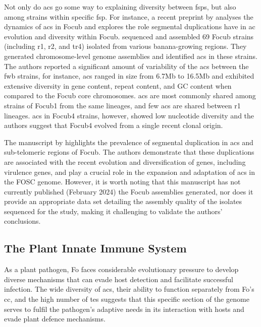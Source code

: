 Not only do \acp{ac} go some way to explaining diversity between \acp{fsp}, but also among strains within specific \ac{fsp}. For instance, a recent preprint by \textcite{Westerhoven2023} analyses the dynamics of \acp{ac} in \ac{Focub} and explores the role segmental duplications have in \ac{ac} evolution and diversity within \ac{Focub}. \textcite{Westerhoven2023} sequenced and assembled 69 \ac{Focub} strains (including \ac{r1}, \ac{r2}, and \ac{tr4})  isolated from various banana-growing regions. They generated chromosome-level genome assemblies and identified \acp{ac} in these strains.  The authors reported a significant amount of variability of the \acp{ac} between the \ac{fwb} strains, for instance, \acp{ac} ranged in size from 6.7Mb to 16.5Mb and exhibited extensive diversity in gene content, repeat content, and GC content when compared to the \ac{Focub} core chromosomes. \Acp{ac} are most commonly shared among strains of \ac{Focub1} from the same lineages, and few \acp{ac} are shared between \ac{r1} lineages. \Acp{ac} in \ac{Focub4} strains, however, showed low nucleotide diversity and the authors suggest that \ac{Focub4} evolved from a single recent clonal origin. 

The manuscript by \textcite{Westerhoven2023} highlights the prevalence of segmental duplication in \acp{ac} and sub-telomeric regions of \ac{Focub}. The authors demonstrate that these duplications are associated with the recent evolution and diversification of genes, including virulence genes, and play a crucial role in the expansion and adaptation of \acp{ac} in the \ac{FOSC} genome. However, it is worth noting that this manuscript has not currently published (February 2024) the \ac{Focub} assemblies generated, nor does it provide an appropriate data set detailing the assembly quality of the isolates sequenced for the study, making it challenging to validate the authors' conclusions. 

\subsection{The Plant Innate Immune System}

As a plant pathogen, \ac{Fo} faces considerable evolutionary pressure to develop diverse mechanisms that can evade host detection and facilitate successful infection. The wide diversity of \acp{ac}, their ability to function separately from \ac{Fo}'s \ac{cc}, and the high number of \acp{te}  suggests that this specific section of the genome serves to fulfil the pathogen's adaptive needs in its interaction with hosts and evade plant defence mechanisms.

